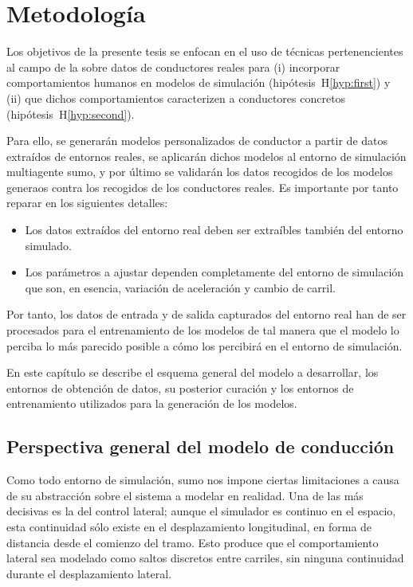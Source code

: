 \chapter{Metodología}
\label{ch:methodology}

Los objetivos de la presente tesis se enfocan en el uso de técnicas pertenencientes al campo de la  sobre datos de conductores reales para (i) incorporar comportamientos humanos en modelos de simulación (hipótesis~H\ref{hyp:first}) y (ii) que dichos comportamientos caracterizen a conductores concretos (hipótesis~H\ref{hyp:second}).

Para ello, se generarán modelos personalizados de conductor a partir de datos extraídos de entornos reales, se aplicarán dichos modelos al entorno de simulación multiagente \gls{sumo}, y por último se validarán los datos recogidos de los modelos generaos contra los recogidos de los conductores reales. Es importante por tanto reparar en los siguientes detalles:

\begin{itemize}
	\item Los datos extraídos del entorno real deben ser extraíbles también del entorno simulado. 
	\item Los parámetros a ajustar dependen completamente del entorno de simulación que son, en esencia, variación de aceleración y cambio de carril.
\end{itemize}

Por tanto, los datos de entrada y de salida capturados del entorno real han de ser procesados para el entrenamiento de los modelos de tal manera que el modelo lo perciba lo más parecido posible a cómo los percibirá en el entorno de simulación.

En este capítulo se describe el esquema general del modelo a desarrollar, los entornos de obtención de datos, su posterior curación y los entornos de entrenamiento utilizados para la generación de los modelos.

\section{Perspectiva general del modelo de conducción}

Como todo entorno de simulación, \gls{sumo} nos impone ciertas limitaciones a causa de su abstracción sobre el sistema a modelar en realidad. Una de las más decisivas es la del control lateral; aunque el simulador es continuo en el espacio, esta continuidad sólo existe en el desplazamiento longitudinal, en forma de distancia desde el comienzo del tramo. Esto produce que el comportamiento lateral sea modelado como saltos discretos entre carriles, sin ninguna continuidad durante el desplazamiento lateral.

